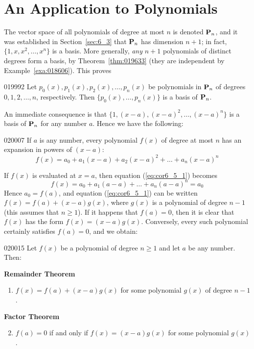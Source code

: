 \section{An Application to Polynomials}
\label{sec:6_5}

The vector space of all polynomials of degree at most $n$ is denoted $\textbf{P}_{n}$, and it was established in Section~\ref{sec:6_3} that $\textbf{P}_{n}$ has dimension $n + 1$; in fact, $\{1, x, x^{2}, \dots, x^{n}\}$ is a basis. More generally, \textit{any} $n + 1$ polynomials of distinct degrees form a basis, by Theorem~\ref{thm:019633} (they are independent by Example~\ref{exa:018606}). This proves

\begin{theorem}{}{019992}
Let $p_{0}(x), p_{1}(x), p_{2}(x), \dots, p_{n}(x)$ be polynomials in $\textbf{P}_{n}$ of degrees $0, 1, 2, \dots, n$, respectively. Then $\{p_{0}(x), \dots, p_{n}(x)\}$ is a basis of $\textbf{P}_{n}$.
\end{theorem}

An immediate consequence is that $\{1, (x - a), (x - a)^{2}, \dots, (x - a)^{n}\}$ is a basis of $\textbf{P}_{n}$ for any number $a$. Hence we have the following:

\begin{corollary}{}{020007}
If $a$ is any number, every polynomial $f(x)$ of degree at most $n$ has an expansion in powers of $(x - a)$:
\begin{equation}
\label{eq:cor6_5_1}
f(x) = a_0 + a_1(x - a) + a_2(x - a)^2 + \dots + a_n(x - a)^n
\end{equation}
\end{corollary}

If $f(x)$ is evaluated at $x = a$, then equation (\ref{eq:cor6_5_1}) becomes
\begin{equation*}
f(x) = a_0 + a_1(a - a) + \dots + a_n(a - a)^n = a_0
\end{equation*}
Hence $a_{0} = f(a)$, and equation (\ref{eq:cor6_5_1}) can be written $f(x) = f(a) + (x - a)g(x)$, where $g(x)$ is a polynomial of degree $n - 1$ (this assumes that $n \geq 1$). If it happens that $f(a) = 0$, then it is clear that $f(x)$ has the form $f(x) = (x - a)g(x)$. Conversely, every such polynomial certainly satisfies $f(a) = 0$, and we obtain:

\begin{corollary}{}{020015}
Let $f(x)$ be a polynomial of degree $n \geq 1$ and let $a$ be any number. Then:

\textbf{Remainder Theorem}
\begin{enumerate}
\item $f(x) = f(a) + (x - a)g(x)$ for some polynomial $g(x)$ of degree $n - 1$.
\end{enumerate}

\textbf{Factor Theorem}
\begin{enumerate}\setcounter{enumi}{1}
\item $f(a) = 0$ if and only if $f(x) = (x - a)g(x)$ for some polynomial $g(x)$.
\end{enumerate}
\end{corollary}

